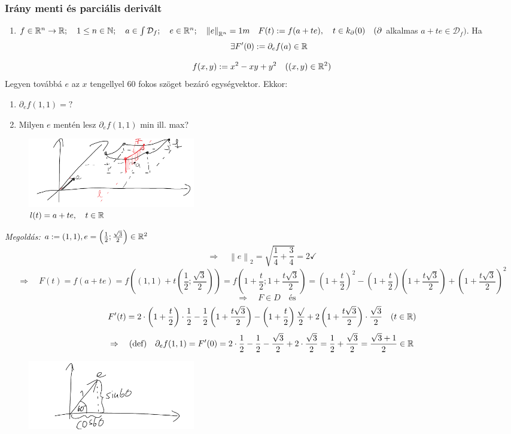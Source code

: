 \documentclass[a4paper,11.5pt]{article}
\newcommand{\norm}[1]{\left\lVert#1\right\rVert}
\begin{document}
	\subsubsection{Irány menti és parciális derivált}
	\begin{revision}
		\begin{enumerate} 
			\item $f\in\R{^n}\to\R;\quad 1\leq n\in\N;\quad a\in\int\mathcal{D}_f;\quad e\in\R^n;\quad \norm{e}_{\R^n}=1 m\quad F(t):=f(a+te),\quad t\in k_\partial(0)\quad (\partial$ alkalmas $a+te\in\mathcal{D}_f).$ Ha
			\[ \exists F'(0):=\partial_ef(a)\in\mathbb{R} \]
		\end{enumerate}
	\end{revision}
	\begin{task}
		\[ f(x,y):=x^2-xy+y^2\quad ((x,y)\in\mathbb{R}^2) \]
		Legyen továbbá $e$ az $x$ tengellyel 60 fokos szöget bezáró egységvektor.
		Ekkor:
		\begin{enumerate}
			\item $\partial_{e}f(1,1)=?$
			\item Milyen $e$ mentén lesz $\partial_{e}f(1,1)$ min ill. max?
		\end{enumerate}
		\begin{figure}[H]
			\centering
			\includegraphics[height=3cm]{kepek/30.png}
			\caption{$l(t)=a+te,\quad  t\in\mathbb{R}$}
		\end{figure}
		\textit{Megoldás:} $a:=(1,1), e=\left(\frac{1}{2};\frac{\sqrt{3}}{2}\right)\in\mathbb{R}^2$
		\[ \Rightarrow\quad \norm{e}_2=\sqrt{\frac{1}{4}+\frac{3}{4}}=2\checkmark \]
		\[ \Rightarrow \quad F(t)=f(a+te)=f((1,1)+t\left(\frac{1}{2};\frac{\sqrt{3}}{2}\right))=f\left(1+\frac{t}{2};1+\frac{t\sqrt{3}}{2}\right)=\left(1+\frac{t}{2}\right)^2-\left(1+\frac{t}{2}\right)\left(1+\frac{t\sqrt{3}}{2}\right)+\left(1+\frac{t\sqrt{3}}{2}\right)^2\]
		\[\quad \Rightarrow\quad F\in D\quad \text{és} \]
		\[ F'(t)=2\cdot\left(1+\frac{t}{2}\right)\cdot\frac{1}{2}-\frac{1}{2}\left(1+\frac{t\sqrt{3}}{2}\right)-\left(1+\frac{t}{2}\right)\frac{\sqrt{}}{2}+2\left(1+\frac{t\sqrt{3}}{2}\right)\cdot\frac{\sqrt{3}}{2}\quad (t\in\mathbb{R}) \]
		\[\Rightarrow\quad \text{(def)}\quad \partial_ef(1,1)=F'(0)=2\cdot\frac{1}{2}-\frac{1}{2}-\frac{\sqrt{3}}{2}+2\cdot\frac{\sqrt{3}}{2}=\frac{1}{2}+\frac{\sqrt{3}}{2}=\frac{\sqrt{3}+1}{2}\in\mathbb{R} \]
		\begin{figure}[H]
			\centering
			\includegraphics[height=3cm]{kepek/31.png}
			\caption{}
		\end{figure}
		
	\end{task}
\end{document}
